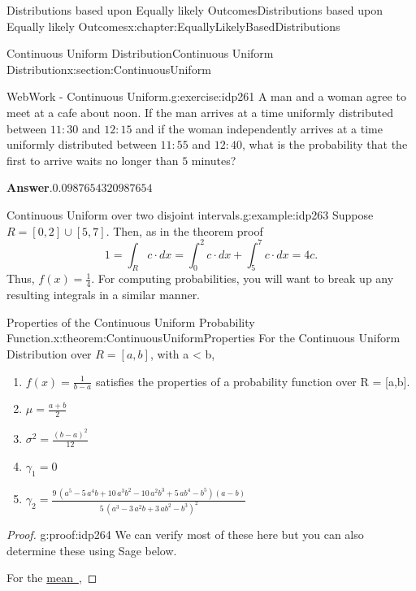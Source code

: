 \documentclass[oneside,10pt,]{book}
\newcommand{\blocktitlefont}{\relax}
\newcommand{\xreffont}{\relax}
\numberwithin{equation}{section}
\begin{document}
\begin{chapterptx}{Distributions based upon Equally likely Outcomes}{}{Distributions based upon Equally likely Outcomes}{}{}{x:chapter:EquallyLikelyBasedDistributions}
\begin{sectionptx}{Continuous Uniform Distribution}{}{Continuous Uniform Distribution}{}{}{x:section:ContinuousUniform}
%
\begin{inlineexercise}{WebWork - Continuous Uniform.}{g:exercise:idp261}%
A man and a woman agree to meet at a cafe about noon. If the man arrives at a time uniformly distributed between \(11:30\) and \(12:15\) and if the woman independently arrives at a time uniformly distributed between \(11:55\) and \(12:40\), what is the probability that the first to arrive waits no longer than \(5\) minutes?%
\par\smallskip%
\noindent\textbf{\blocktitlefont Answer}.\hypertarget{g:answer:idp262}{}\quad{}\(0.0987654320987654\)%
\end{inlineexercise}%
\begin{example}{Continuous Uniform over two disjoint intervals.}{g:example:idp263}%
Suppose \(R = [0,2] \cup [5,7]\).  Then, as in the theorem proof%
\begin{equation*}
1 = \int_R c \cdot dx = \int_0^2 c \cdot dx + \int_5^7 c \cdot dx = 4c.
\end{equation*}
Thus, \(f(x) = \frac{1}{4}\). For computing probabilities, you will want to break up any resulting integrals in a similar manner.%
\end{example}
%
\par
\begin{theorem}{Properties of the Continuous Uniform Probability Function.}{}{x:theorem:ContinuousUniformProperties}%
For the Continuous Uniform Distribution over \(R = [a,b]\), with a \textless{} b,%
\begin{enumerate}
\item{}\(f(x) = \frac{1}{b-a}\) satisfies the properties of a probability function over R = [a,b].%
\item{}\(\displaystyle \mu = \frac{a+b}{2}\)%
\item{}\(\displaystyle \sigma^2 = \frac{(b-a)^2}{12}\)%
\item{}\(\displaystyle \gamma_1 = 0\)%
\item{}\(\displaystyle \gamma_2 = \frac{9 \, {\left(a^{5} - 5 \, a^{4} b + 10 \, a^{3} b^{2} - 10 \, a^{2} b^{3} + 5 \, a b^{4} - b^{5}\right)} {\left(a - b\right)}}{5 \, {\left(a^{3} - 3 \, a^{2} b + 3 \, a b^{2} - b^{3}\right)}^{2}}\)%
\end{enumerate}
%
\end{theorem}
 \begin{proof}{}{g:proof:idp264}
We can verify most of these here but you can also determine these using Sage below.%
\par
For the \hyperlink{x:li:TheoreticalMean}{mean~{\xreffont 1}},%

\end{proof}
\end{sectionptx}
\end{chapterptx}
\end{document}
